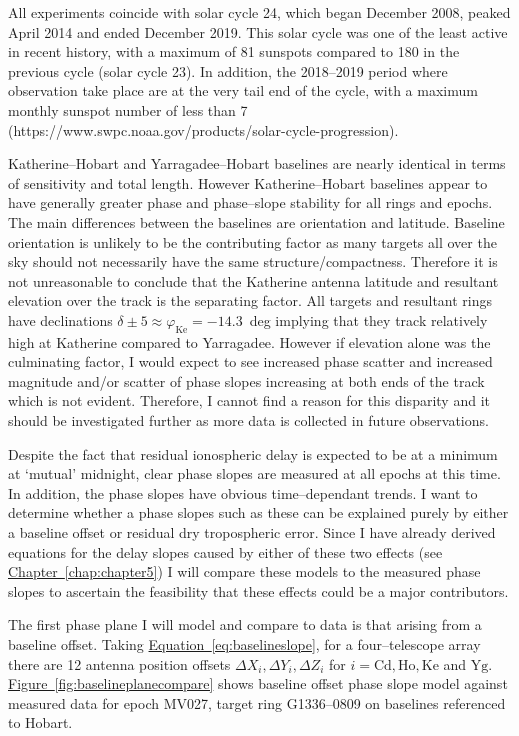 		All experiments coincide with solar cycle 24, which began December 2008, peaked April 2014 and ended December 2019. This solar cycle was one of the least active in recent history, with a maximum of 81 sunspots compared to 180 in the previous cycle (solar cycle 23). In addition, the 2018--2019 period where observation take place are at the very tail end of the cycle, with a maximum monthly sunspot number of less than 7 (https://www.swpc.noaa.gov/products/solar-cycle-progression).
		
		Katherine--Hobart and Yarragadee--Hobart baselines are nearly identical in terms of sensitivity and total length. However Katherine--Hobart baselines appear to have generally greater phase and phase--slope stability for all rings and epochs. The main differences between the baselines are orientation and latitude. Baseline orientation is unlikely to be the contributing factor as many targets all over the sky should not necessarily have the same structure/compactness. Therefore it is not unreasonable to conclude that the Katherine antenna latitude and resultant elevation over the track is the separating factor. All targets and resultant rings have declinations $\delta\pm5\approx\varphi_\text{Ke}=-14.3$~deg implying that they track relatively high at Katherine compared to Yarragadee. However if elevation alone was the culminating factor, I would expect to see increased phase scatter and increased magnitude and/or scatter of phase slopes increasing at both ends of the track which is not evident. Therefore, I cannot find a reason for this disparity and it should be investigated further as more data is collected in future \spirals\space observations.
		
		Despite the fact that residual ionospheric delay is expected to be at a minimum at `mutual' midnight, clear phase slopes are measured at all epochs at this time. In addition, the phase slopes have obvious time--dependant trends. I want to determine whether a phase slopes such as these can be explained purely by either a baseline offset or residual dry tropospheric error. Since I have already derived equations for the delay slopes caused by either of these two effects (see \hyperref[chap:chapter5]{Chapter~\ref*{chap:chapter5}}) I will compare these models to the measured phase slopes to ascertain the feasibility that these effects could be a major contributors.
		
		The first phase plane I will model and compare to data is that arising from a baseline offset. Taking \hyperref[eq:baselineslope]{Equation~\ref*{eq:baselineslope}}, for a four--telescope array there are 12 antenna position offsets $\Delta X_i, \Delta Y_i, \Delta Z_i$ for $i=\text{Cd}, \text{Ho}, \text{Ke}$ and $\text{Yg}$. \hyperref[fig:baselineplanecompare]{Figure~\ref*{fig:baselineplanecompare}} shows baseline offset phase slope model against measured data for epoch MV027, target ring G1336--0809 on baselines referenced to Hobart. 

